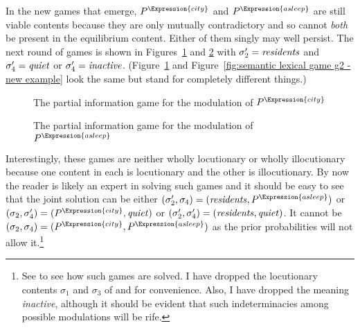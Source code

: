 In the new games that emerge, $P^\Expression{city}$ and $P^\Expression{asleep}$ are still viable contents because they are only mutually contradictory and so cannot \emph{both} be present in the equilibrium content. Either of them singly may well persist. The next round of games is shown in Figures~\ref{fig:game corresponding to the modulation of P^city} and \ref{fig:game corresponding to the modulation of P^asleep} with $\sigma'_2 = \hbox{\emph{residents}}$ and $\sigma'_4 = \hbox{\emph{quiet}}$ or $\sigma'_4 = \hbox{\emph{inactive}}$. (Figure~\ref{fig:game corresponding to the modulation of P^city} and Figure~\ref{fig:semantic lexical game g2 - new example} look the same but stand for completely different things.)


\begin{figure}[h] 
 
\caption{The partial information game for the modulation of $P^\Expression{city}$}
\label{fig:game corresponding to the modulation of P^city}
\end{figure}

\begin{figure}[h] 
 
\caption{The partial information game for the modulation of $P^\Expression{asleep}$}
\label{fig:game corresponding to the modulation of P^asleep}
\end{figure}

Interestingly, these games are neither wholly locutionary or wholly illocutionary because one content in each is locutionary and the other is illocutionary. By now the reader is likely an expert in solving such games and it should be easy to see that the joint solution can be either $(\sigma'_2, \sigma_4) = (\hbox{\emph{residents}}, P^\Expression{asleep})$ or $(\sigma_2, \sigma'_4) = (P^\Expression{city}, \hbox{\emph{quiet}})$ or $(\sigma'_2, \sigma'_4) = (\hbox{\emph{residents}}, \hbox{\emph{quiet}})$. It cannot be $(\sigma_2, \sigma_4) = (P^\Expression{city}, P^\Expression{asleep})$ as the prior probabilities will not allow it.\footnote{See  to see how such games are solved. I have dropped the locutionary contents $\sigma_1$ and $\sigma_3$ of  and  for convenience. Also, I have dropped the meaning \emph{inactive}, although it should be evident that such indeterminacies among possible modulations will be rife.}

